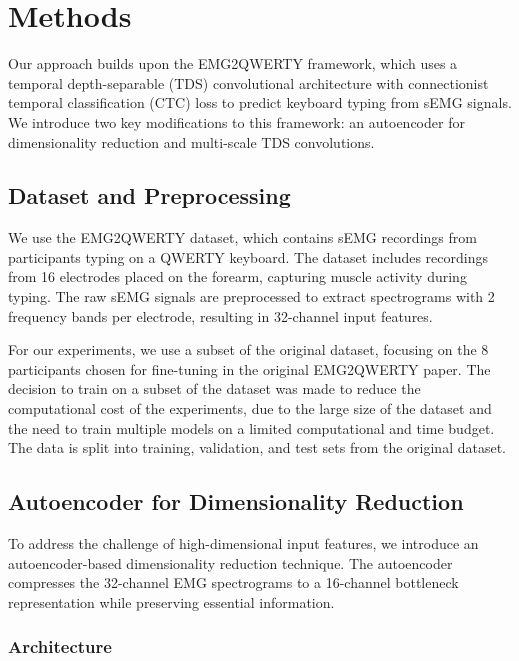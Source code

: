 \section{Methods}\label{sec:methods}

Our approach builds upon the EMG2QWERTY framework, which uses a temporal depth-separable (TDS) convolutional architecture with connectionist temporal classification (CTC) loss to predict keyboard typing from sEMG signals. We introduce two key modifications to this framework: an autoencoder for dimensionality reduction and multi-scale TDS convolutions.

\subsection{Dataset and Preprocessing}\label{subsec:dataset}

We use the EMG2QWERTY dataset, which contains sEMG recordings from participants typing on a QWERTY keyboard. The dataset includes recordings from 16 electrodes placed on the forearm, capturing muscle activity during typing. The raw sEMG signals are preprocessed to extract spectrograms with 2 frequency bands per electrode, resulting in 32-channel input features.

For our experiments, we use a subset of the original dataset, focusing on the 8 participants chosen for fine-tuning in the original EMG2QWERTY paper. The decision to train on a subset of the dataset was made to reduce the computational cost of the experiments, due to the large size of the dataset and the need to train multiple models on a limited computational and time budget. The data is split into training, validation, and test sets from the original dataset.

\subsection{Autoencoder for Dimensionality Reduction}\label{subsec:autoencoder}

To address the challenge of high-dimensional input features, we introduce an autoencoder-based dimensionality reduction technique. The autoencoder compresses the 32-channel EMG spectrograms to a 16-channel bottleneck representation while preserving essential information.

\subsubsection{Architecture}

